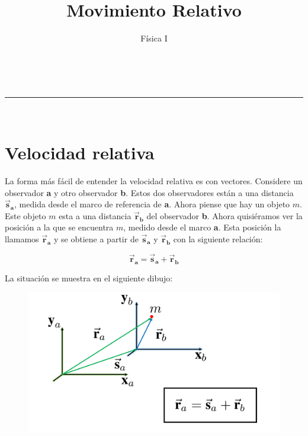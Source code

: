 \documentclass[a4paper,11pt]{article}
\makeatletter
\newcommand{\linia}{\rule{\linewidth}{0.5pt}}
\renewcommand{\maketitle}{
	\begin{center}
		\vspace{2ex}
		{\huge \textsc{\@title}}
		\vspace{1ex}
		\\
		\linia\\
		\@author \hfill \@date
		\vspace{4ex}
	\end{center}
}
\makeatother
\begin{document}
	\title{Movimiento Relativo}
	
	\author{Física I}
	
	\date{}
	
	\maketitle
	
			
\tableofcontents

	\section{Velocidad relativa}
	
	La forma más fácil de entender la velocidad relativa es con vectores. Considere un observador \textbf{a} y otro observador \textbf{b}. Estos dos observadores están a una distancia $\vec{\textbf{s}}_{\textbf{a}}$, medida desde el marco de referencia de \textbf{a}. Ahora piense que hay un objeto $m$. Este objeto $m$ esta a una distancia $\vec{\textbf{r}}_{\textbf{b}}$ del observador \textbf{b}. Ahora quisiéramos ver la posición a la que se encuentra $m$, medido desde el marco \textbf{a}. Esta posición la llamamos $\vec{\textbf{r}}_{\textbf{a}}$ y se obtiene a partir de $\vec{\textbf{s}}_{\textbf{a}}$ y $\vec{\textbf{r}}_{\textbf{b}}$ con la siguiente relación:
	
	
	\begin{equation}\label{1}
	\vec{\textbf{r}}_{\textbf{a}} = \vec{\textbf{s}}_{\textbf{a}} + \vec{\textbf{r}}_{\textbf{b}}
	\end{equation}
	
	
	La situación se muestra en el siguiente dibujo:
	
	\begin{figure}[h]
		\includegraphics[width=.9\linewidth]{./im/mvtorela}
		\label{fcN4}
	\end{figure}
	
\end{document}
